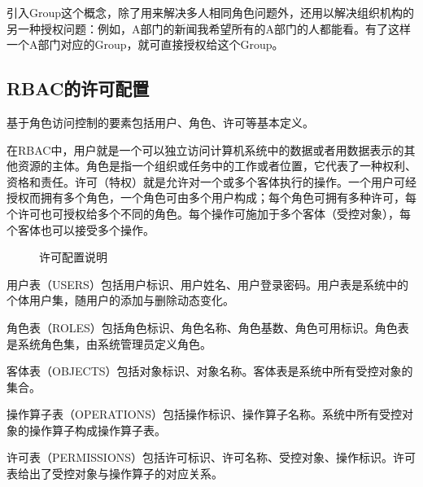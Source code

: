     引入Group这个概念，除了用来解决多人相同角色问题外，还用以解决组织机构的另一种授权问题：例如，A部门的新闻我希望所有的A部门的人都能看。有了这样一个A部门对应的Group，就可直接授权给这个Group。


\subsection {RBAC的许可配置}

      基于角色访问控制的要素包括用户、角色、许可等基本定义。

    在RBAC中，用户就是一个可以独立访问计算机系统中的数据或者用数据表示的其他资源的主体。角色是指一个组织或任务中的工作或者位置，它代表了一种权利、资格和责任。许可（特权）就是允许对一个或多个客体执行的操作。一个用户可经授权而拥有多个角色，一个角色可由多个用户构成；每个角色可拥有多种许可，每个许可也可授权给多个不同的角色。每个操作可施加于多个客体（受控对象），每个客体也可以接受多个操作。

    \begin{figure}
        \centering
        \caption {许可配置说明} \label{fig:permConfig1}
    \end{figure}

    用户表（USERS）包括用户标识、用户姓名、用户登录密码。用户表是系统中的个体用户集，随用户的添加与删除动态变化。

    角色表（ROLES）包括角色标识、角色名称、角色基数、角色可用标识。角色表是系统角色集，由系统管理员定义角色。

    客体表（OBJECTS）包括对象标识、对象名称。客体表是系统中所有受控对象的集合。

    操作算子表（OPERATIONS）包括操作标识、操作算子名称。系统中所有受控对象的操作算子构成操作算子表。

    许可表（PERMISSIONS）包括许可标识、许可名称、受控对象、操作标识。许可表给出了受控对象与操作算子的对应关系。


